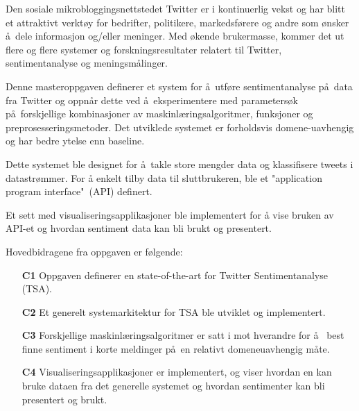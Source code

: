 Den sosiale mikrobloggingsnettstedet Twitter er i kontinuerlig vekst og har blitt et attraktivt verkt\o y for bedrifter, politikere, markedsf\o rere og andre som \o nsker \aa~dele informasjon og/eller meninger. Med \o kende brukermasse, kommer det ut flere og flere systemer og forskningsresultater relatert til Twitter, sentimentanalyse og meningsm\aa linger.

Denne masteroppgaven definerer et system for \aa~utf\o re sentimentanalyse p\aa~data fra Twitter og oppn\aa r dette ved \aa~eksperimentere med parameters\o k p\aa~forskjellige kombinasjoner av maskinl\ae ringsalgoritmer, funksjoner og preprosesseringsmetoder. Det utviklede systemet er forholdsvis domene-uavhengig og har bedre ytelse enn baseline.

Dette systemet ble designet for \aa~takle store mengder data og klassifisere tweets i datastr\o mmer. For {\aa} enkelt tilby data til sluttbrukeren, ble et "application program interface"~(API) definert.

Et sett med visualiseringsapplikasjoner ble implementert for {\aa} vise bruken av API-et og hvordan sentiment data kan bli brukt og presentert.

Hovedbidragene fra oppgaven er f\o lgende:

\begin{itemize}
\item[\textbf{C1}] Oppgaven definerer en state-of-the-art for Twitter Sentimentanalyse (TSA).

\item[\textbf{C2}] Et generelt systemarkitektur for TSA ble utviklet og implementert.

\item[\textbf{C3}] Forskjellige maskinl\ae ringsalgoritmer er satt i mot hverandre for \aa~ best finne sentiment i korte meldinger p\aa~en relativt domeneuavhengig m{\aa}te.

\item[\textbf{C4}] Visualiseringsapplikasjoner er implementert, og viser hvordan en kan bruke dataen fra det generelle systemet og hvordan sentimenter kan bli presentert og brukt.
\end{itemize}

\clearpage
